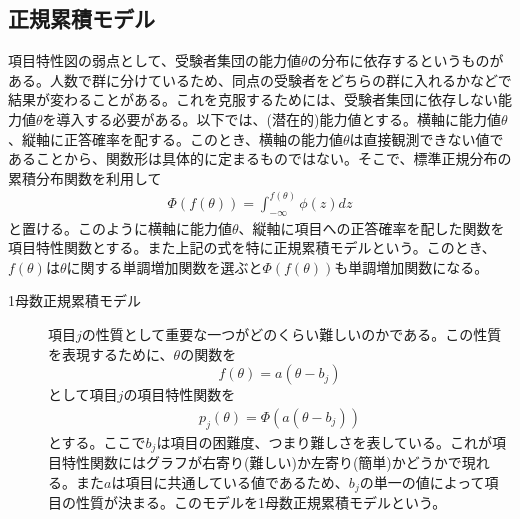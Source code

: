 \documentclass[12pt]{jarticle}
\numberwithin{equation}{subsection}
\begin{document}
\subsection{正規累積モデル}
項目特性図の弱点として、受験者集団の能力値$\theta$の分布に依存するというものがある。人数で群に分けているため、同点の受験者をどちらの群に入れるかなどで結果が変わることがある。これを克服するためには、受験者集団に依存しない能力値$\theta$を導入する必要がある。以下では、(潜在的)能力値とする。横軸に能力値$\theta$、縦軸に正答確率を配する。このとき、横軸の能力値$\theta$は直接観測できない値であることから、関数形は具体的に定まるものではない。そこで、標準正規分布の累積分布関数を利用して
\begin{align}
  \displaystyle
 \Phi (f(\theta)) = \int_{-\infty}^{f(\theta)} \phi(z)dz
\end{align}
と置ける。このように横軸に能力値$\theta$、縦軸に項目への正答確率を配した関数を項目特性関数とする。また上記の式を特に正規累積モデルという。このとき、$f(\theta)$は$\theta$に関する単調増加関数を選ぶと$\Phi (f(\theta))$も単調増加関数になる。
\begin{description}
  \item[1母数正規累積モデル] 項目$j$の性質として重要な一つがどのくらい難しいのかである。この性質を表現するために、$\theta$の関数を
  \begin{equation}
    \displaystyle
    f(\theta) = a(\theta - b_j)
  \end{equation}
  として項目$j$の項目特性関数を
  \begin{align}
    \displaystyle
    p_j(\theta) = \Phi (a(\theta - b_j))
  \end{align}
  とする。ここで$b_j$は項目の困難度、つまり難しさを表している。これが項目特性関数にはグラフが右寄り(難しい)か左寄り(簡単)かどうかで現れる。また$a$は項目に共通している値であるため、$b_j$の単一の値によって項目の性質が決まる。このモデルを1母数正規累積モデルという。
\end{description}
\end{document}
